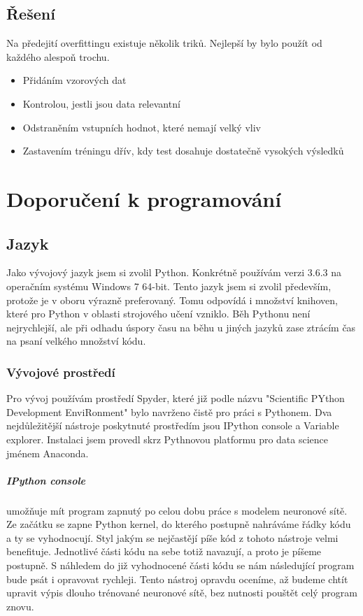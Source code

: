 \documentclass[12pt,a4paper]{report}
\begin{document}
	\section{Řešení}
	Na předejití overfittingu existuje několik triků. Nejlepší by bylo použít od každého alespoň trochu.
	\begin{itemize}
		\item Přidáním vzorových dat
		\item Kontrolou, jestli jsou data relevantní
		\item Odstraněním vstupních hodnot, které nemají velký vliv
		\item Zastavením tréningu dřív, kdy test dosahuje dostatečně vysokých výsledků
	\end{itemize}
	

\chapter{Doporučení k programování}
	\section{Jazyk}
	Jako vývojový jazyk jsem si zvolil Python. Konkrétně používám verzi 3.6.3 na operačním systému Windows 7 64-bit. Tento jazyk jsem si zvolil především, protože je v oboru výrazně preferovaný. Tomu odpovídá i množství knihoven, které pro Python v oblasti strojového učení vzniklo. Běh Pythonu není nejrychlejší, ale při odhadu úspory času na běhu u jiných jazyků zase ztrácím čas na psaní velkého množství kódu.
		\subsection{Vývojové prostředí}
		Pro vývoj používám prostředí Spyder, které již podle názvu "Scientific PYthon Development EnviRonment" bylo navrženo čistě pro práci s Pythonem. Dva nejdůležitější nástroje poskytnuté prostředím jsou IPython console a Variable explorer. Instalaci jsem provedl skrz Pythnovou platformu pro data science jménem Anaconda.
		\paragraph{IPython console}
		umožňuje mít program zapnutý po celou dobu práce s modelem neuronové sítě. Ze začátku se zapne Python kernel, do kterého postupně nahráváme řádky kódu a ty se vyhodnocují. Styl jakým se nejčastějí píše kód z tohoto nástroje velmi benefituje. Jednotlivé části kódu na sebe totiž navazují, a proto je píšeme postupně. S náhledem do již vyhodnocené části kódu se nám následující program bude psát i opravovat rychleji. Tento nástroj opravdu oceníme, až budeme chtít upravit výpis dlouho trénované neuronové sítě, bez nutnosti pouštět celý program znovu.
\end{document}
